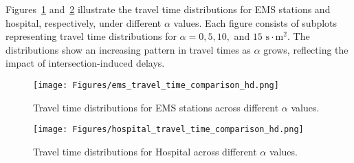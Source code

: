 Figures~\ref{fig:ems_travel_time} and~\ref{fig:hospital_travel_time} illustrate the travel time distributions for EMS stations and hospital, respectively, under different \(\alpha\) values. Each figure consists of subplots representing travel time distributions for \(\alpha = 0, 5, 10,\) and \(15\) $\text{s}\cdot\text{m}^2$. The distributions show an increasing pattern in travel times as \(\alpha\) grows, reflecting the impact of intersection-induced delays. 

\begin{figure}[h]
    \centering
    \texttt{[image: Figures/ems\_travel\_time\_comparison\_hd.png]}
    \caption{Travel time distributions for EMS stations across different \(\alpha\) values.}
    \label{fig:ems_travel_time}
\end{figure}
\begin{figure}[h]
    \centering
    \texttt{[image: Figures/hospital\_travel\_time\_comparison\_hd.png]}
    \caption{Travel time distributions for Hospital across different \(\alpha\) values.}
    \label{fig:hospital_travel_time}
\end{figure}
